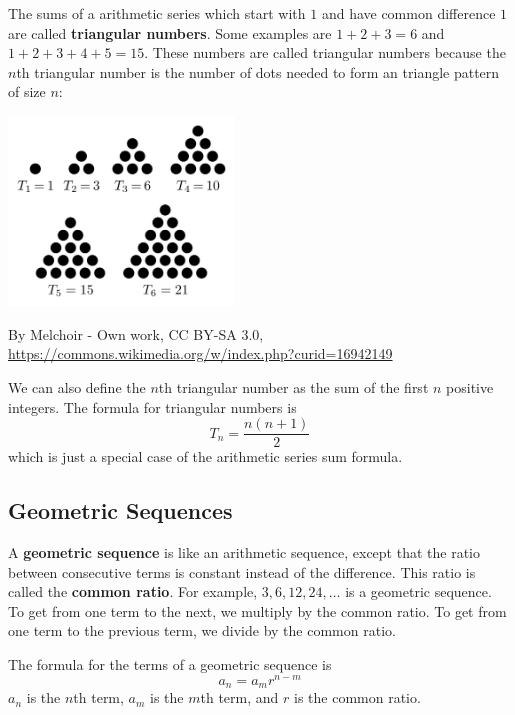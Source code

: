\documentclass[twocolumn]{article}
\begin{document}
    The sums of a arithmetic series which start with $1$ and have common
    difference $1$ are called \textbf{triangular numbers}. Some examples are
    $1 + 2 + 3 = 6$ and $1 + 2 + 3 + 4 + 5 = 15$. These numbers are called
    triangular numbers because the $n$th triangular number is the number of
    dots needed to form an triangle pattern of size $n$:
    \begin{center}
        \includegraphics[width=6cm]{triangular_numbers}

        By Melchoir - Own work, CC BY-SA 3.0,
        \url{https://commons.wikimedia.org/w/index.php?curid=16942149}
    \end{center}
    We can also define the $n$th triangular number as the sum of the first
    $n$ positive integers. The formula for triangular numbers is
    \[T_n = \frac{n(n + 1)}{2}\] which is just a special case of the
    arithmetic series sum formula.

    \subsection*{Geometric Sequences}
    A \textbf{geometric sequence} is like an arithmetic sequence, except
    that the ratio between consecutive terms is constant instead of the
    difference. This ratio is called the \textbf{common ratio}. For example,
    $3, 6, 12, 24, \dots$ is a geometric sequence. To get from one term to
    the next, we multiply by the common ratio. To get from one term to the
    previous term, we divide by the common ratio.

    The formula for the terms of a geometric sequence is
    \[a_n = a_mr^{n - m}\] $a_n$ is the $n$th term, $a_m$ is the $m$th term,
    and $r$ is the common ratio.
\end{document}
